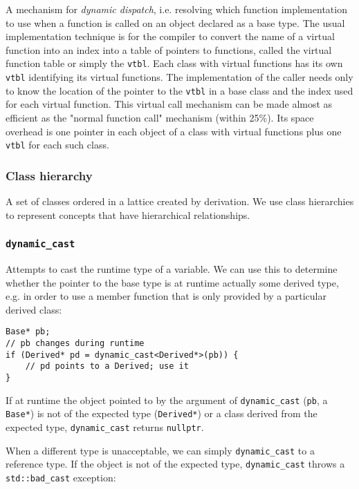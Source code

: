\documentclass[8pt, table, xcdraw]{article}%
\begin{document}
A mechanism for \textit{dynamic dispatch}, i.e. resolving which function implementation to use when a function is called on an object declared as a base type. The usual implementation technique is for the compiler to convert the name of a virtual function into an index into a table of pointers to functions, called the virtual function table or simply the \lstinline{vtbl}. Each class with virtual functions has its own \lstinline{vtbl} identifying its virtual functions. The implementation of the caller needs only to know the location of the pointer to the \lstinline{vtbl} in a base class and the index used for each virtual function. This virtual call mechanism can be made almost as efficient as the "normal function call" mechanism (within 25\%). Its space overhead is one pointer in each object of a class with virtual functions plus one \lstinline{vtbl} for each such class.

\subsubsection{Class hierarchy}

A set of classes ordered in a lattice created by derivation. We use class hierarchies to represent concepts that have hierarchical relationships.

\subsubsection{\lstinline{dynamic_cast}}

Attempts to cast the runtime type of a variable. We can use this to determine whether the pointer to the base type is at runtime actually some derived type, e.g. in order to use a member function that is only provided by a particular derived class:

\begin{lstlisting}
Base* pb;
// pb changes during runtime
if (Derived* pd = dynamic_cast<Derived*>(pb)) {
    // pd points to a Derived; use it
}
\end{lstlisting}

If at runtime the object pointed to by the argument of \lstinline{dynamic_cast} (\lstinline{pb}, a \lstinline{Base*}) is not of the expected type (\lstinline{Derived*}) or a class derived from the expected type, \lstinline{dynamic_cast} returns \lstinline{nullptr}.

When a different type is unacceptable, we can simply \lstinline{dynamic_cast} to a reference type. If the object is not of the expected type, \lstinline{dynamic_cast} throws a \lstinline{std::bad_cast} exception:
\end{document}
